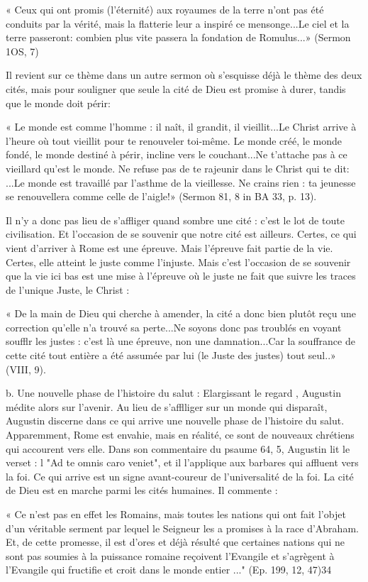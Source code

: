 « Ceux qui ont promis (l'éternité) aux royaumes de la terre n'ont pas été conduits par  la vérité, mais la flatterie leur a inspiré ce mensonge...Le ciel et la terre passeront: combien plus vite passera la fondation de Romulus...» (Sermon 1OS, 7)

Il revient sur ce thème dans un autre sermon où s'esquisse déjà le thème des deux cités, mais pour souligner que seule la cité de Dieu est promise à durer, tandis que le monde doit périr:

« Le monde est comme l'homme : il naît, il grandit, il vieillit...Le Christ arrive à l'heure où tout vieillit pour te renouveler toi-même. Le monde créé, le monde fondé, le monde destiné à périr, incline vers le couchant...Ne t'attache pas à ce vieillard qu'est le monde. Ne refuse pas de te rajeunir dans le Christ qui te dit: ...Le monde est travaillé par l'asthme de la vieillesse. Ne crains rien : ta jeunesse se renouvellera comme celle de l'aigle!» (Sermon 81, 8 in BA 33, p. 13).

Il n'y a donc pas lieu de s'affliger quand sombre une cité : c'est le lot de toute civilisation. Et l'occasion de se souvenir que notre cité est ailleurs. Certes, ce qui vient d'arriver à Rome est une épreuve. Mais l'épreuve fait partie de la vie. Certes, elle atteint le juste comme l'injuste. Mais c'est l'occasion de se souvenir que la vie ici­ bas est une mise à l'épreuve où le juste ne fait que suivre les traces de l'unique Juste, le Christ :

« De la main de Dieu qui cherche à amender, la cité a donc bien plutôt reçu une correction qu'elle n'a trouvé sa perte...Ne soyons donc pas troublés en voyant soufflr les justes : c'est là une épreuve, non une damnation...Car la souffrance de cette cité tout entière a été assumée par lui (le Juste des justes) tout seul..» (VIII, 9).

b.	Une nouvelle phase de l'histoire du salut : Elargissant le regard , Augustin médite alors sur l'avenir. Au lieu de s'afflliger sur un monde qui disparaît, Augustin discerne dans ce qui arrive une nouvelle phase de l'histoire du salut. Apparemment, Rome est envahie, mais en réalité, ce sont de nouveaux chrétiens qui
accourent vers elle. Dans son commentaire du psaume 64, 5, Augustin lit le verset : l	"Ad te omnis caro veniet", et il l'applique aux barbares qui affluent vers la foi. Ce qui arrive est un signe avant-coureur de l'universalité de la foi. La cité de Dieu est en
marche parmi les cités humaines. Il commente :

« Ce n'est pas en effet les Romains, mais toutes les nations qui ont fait l'objet d'un véritable serment par lequel le Seigneur les a promises à la race d'Abraham. Et, de cette promesse, il est d'ores et déjà résulté que certaines nations qui ne sont pas soumies à la puissance romaine reçoivent l'Evangile et s'agrègent à l'Evangile qui fructifie et croit dans le monde entier ..." (Ep. 199, 12, 47)34





